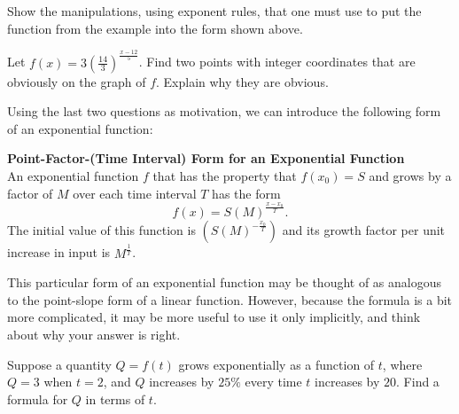 \begin{eg}
\par

\begin{question} Show the manipulations, using exponent rules, that one must use to put the function from the example into the form shown above.
\end{question}

\par

\begin{question} Let $f(x) = 3\left(\frac{14}{3}\right)^{\frac{x-12}{5}}$. Find two points with integer coordinates that are obviously on the graph of $f$. Explain why they are obvious.
\end{question}

\par

Using the last two questions as motivation, we can introduce the following form of an exponential function:

\begin{tcolorbox}
{\bf Point-Factor-(Time Interval) Form for an Exponential Function}\\
An exponential function $f$ that has the property that $f(x_0) = S$ and grows by a factor of $M$ over each time interval $T$ has the form 
\[
f(x) = S(M)^{\frac{x-x_0}{T}}.
\]
The initial value of this function is $\left(S(M)^{-\frac{x_0}{T}}\right)$ and its growth factor per unit increase in input is $M^{\frac{1}{T}}$. 
\end{tcolorbox}

This particular form of an exponential function may be thought of as analogous to the point-slope form of a linear function. However, because the formula is a bit more complicated, it may be more useful to use it only implicitly, and think about why your answer is right.

\par

\begin{eg} Suppose a quantity $Q= f(t)$ grows exponentially as a function of $t$, where $Q = 3$ when $t=2$, and $Q$ increases by $25\%$ every time $t$ increases by $20$. Find a formula for $Q$ in terms of $t$.

\par


\end{eg}
\end{eg}
